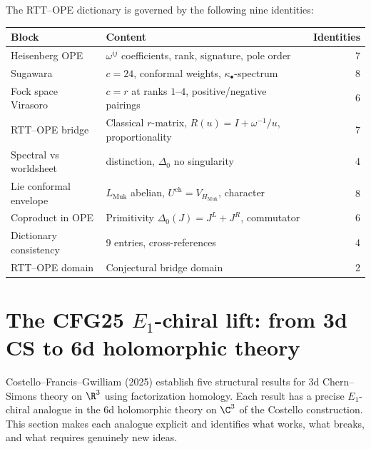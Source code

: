 \begin{remark}
\label{rem:rtt-ope-summary}
The RTT--OPE dictionary is governed by the following nine identities:
\begin{center}
\small
\renewcommand{\arraystretch}{1.15}
\begin{tabular}{llr}
\toprule
\textbf{Block} & \textbf{Content} & \textbf{Identities} \\
\midrule
Heisenberg OPE & $\omega^{ij}$ coefficients, rank, signature, pole order & 7 \\
Sugawara & $c = 24$, conformal weights, $\kappa_\bullet$-spectrum & 8 \\
Fock space Virasoro & $c = r$ at ranks $1$--$4$, positive/negative pairings & 6 \\
RTT--OPE bridge & Classical $r$-matrix, $R(u) = I + \omega^{-1}/u$, proportionality & 7 \\
Spectral vs worldsheet & distinction, $\Delta_0$ no singularity & 4 \\
Lie conformal envelope & $L_{\mathrm{Muk}}$ abelian, $U^{\mathrm{ch}} = V_{H_{\mathrm{Muk}}}$, character & 8 \\
Coproduct in OPE & Primitivity $\Delta_0(J) = J^L + J^R$, commutator & 6 \\
Dictionary consistency & $9$ entries, cross-references & 4 \\
RTT--OPE domain & Conjectural bridge domain & 2 \\
\bottomrule
\end{tabular}
\end{center}
\end{remark}


\section{The CFG25 \texorpdfstring{$E_1$}{E-1}-chiral lift: from 3d CS to 6d holomorphic theory}
\label{sec:cfg25-e1-chiral-lift}

Costello--Francis--Gwilliam (2025) establish five structural results for 3d Chern--Simons theory on $\R^3$ using factorization homology. Each result has a precise $E_1$-chiral analogue in the 6d holomorphic theory on $\C^3$ of the Costello construction. This section makes each analogue explicit and identifies what works, what breaks, and what requires genuinely new ideas.

